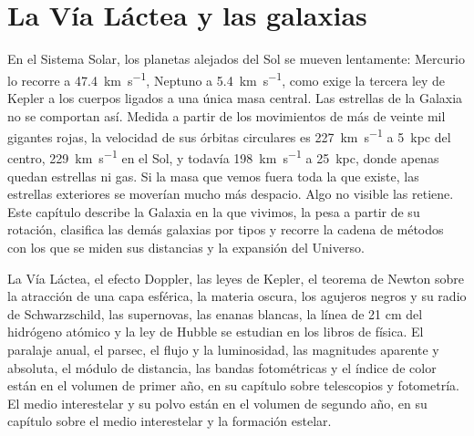 \chapter{La Vía Láctea y las galaxias}\label{ch:b3:milky-way-galaxies}

En el Sistema Solar, los planetas alejados del Sol se mueven lentamente: Mercurio
lo recorre a \qty{47.4}{km.s^{-1}}, Neptuno a \qty{5.4}{km.s^{-1}}, como
exige la tercera ley de Kepler a los cuerpos ligados a una única masa central. Las estrellas
de la Galaxia no se comportan así. Medida a partir de los movimientos de más de
veinte mil gigantes rojas, la velocidad de sus órbitas circulares es
\qty{227}{km.s^{-1}} a \qty{5}{kpc} del centro, \qty{229}{km.s^{-1}}
en el Sol, y todavía \qty{198}{km.s^{-1}} a \qty{25}{kpc}, donde apenas
quedan estrellas ni gas. Si la masa que vemos fuera toda la que existe, las estrellas
exteriores se moverían mucho más despacio. Algo no visible las retiene. Este capítulo
describe la Galaxia en la que vivimos, la pesa a partir de su rotación, clasifica las
demás galaxias por tipos y recorre la cadena de métodos con los que se miden sus
distancias y la expansión del Universo.

\begin{recall}
La Vía Láctea, el efecto Doppler, las leyes de Kepler, el teorema de Newton sobre la
atracción de una capa esférica, la materia oscura, los agujeros negros y su
radio de Schwarzschild, las supernovas, las enanas blancas, la línea de 21 cm del
hidrógeno atómico y la ley de Hubble se estudian en los libros de física. El paralaje anual,
el parsec, el flujo y la luminosidad, las magnitudes aparente y absoluta, el
módulo de distancia, las bandas fotométricas y el índice de color están en el
volumen de primer año, en su capítulo sobre telescopios y fotometría. El
medio interestelar y su polvo están en el volumen de segundo año, en su capítulo
sobre el medio interestelar y la formación estelar.
\end{recall}

